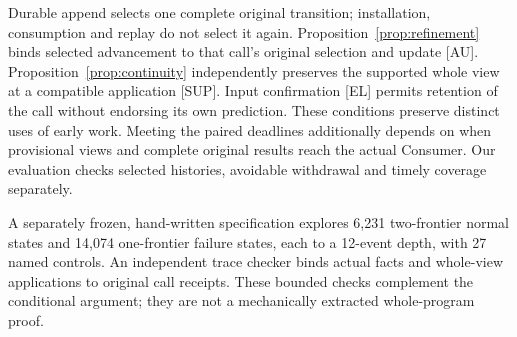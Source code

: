 Durable append selects one complete original transition; installation,
consumption and replay do not select it again.
Proposition~\ref{prop:refinement} binds selected advancement to that call's
original selection and update [AU]. Proposition~\ref{prop:continuity}
independently preserves the supported whole view at a compatible
application [SUP]. Input confirmation [EL] permits retention of the call
without endorsing its own prediction. These conditions preserve distinct
uses of early work. Meeting the paired deadlines additionally depends on
when provisional views and complete original results reach the actual
Consumer. Our evaluation checks selected histories, avoidable withdrawal
and timely coverage separately.

A separately frozen, hand-written specification explores 6,231 two-frontier normal
states and 14,074 one-frontier failure states, each to a 12-event depth,
with 27 named controls. An independent trace checker binds actual facts
and whole-view applications to original call receipts. These bounded
checks complement the conditional argument; they are not a mechanically
extracted whole-program proof.


